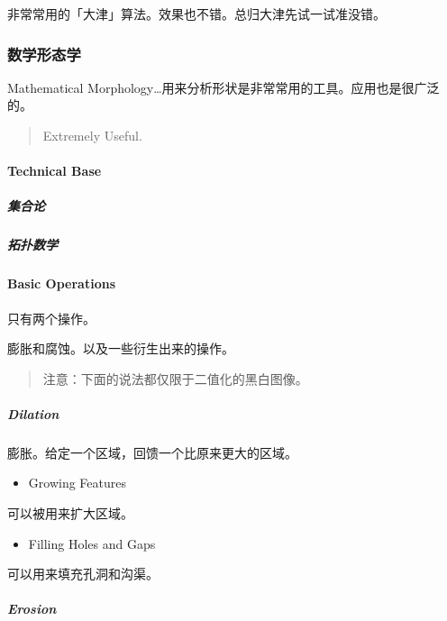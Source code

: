 \documentclass[
]{article}
\begin{document}
非常常用的「大津」算法。效果也不错。总归大津先试一试准没错。

\hypertarget{header-n88}{%
\subsubsection{数学形态学}\label{header-n88}}

Mathematical
Morphology\ldots 用来分析形状是非常常用的工具。应用也是很广泛的。

\begin{quote}
Extremely Useful.
\end{quote}

\hypertarget{header-n92}{%
\paragraph{Technical Base}\label{header-n92}}

\hypertarget{header-n93}{%
\subparagraph{集合论}\label{header-n93}}

\hypertarget{header-n94}{%
\subparagraph{拓扑数学}\label{header-n94}}

\hypertarget{header-n95}{%
\paragraph{Basic Operations}\label{header-n95}}

只有两个操作。

膨胀和腐蚀。以及一些衍生出来的操作。

\begin{quote}
注意：下面的说法都仅限于二值化的黑白图像。
\end{quote}

\hypertarget{header-n100}{%
\subparagraph{Dilation}\label{header-n100}}

膨胀。给定一个区域，回馈一个比原来更大的区域。

\begin{itemize}
\item
  Growing Features
\end{itemize}

可以被用来扩大区域。

\begin{itemize}
\item
  Filling Holes and Gaps
\end{itemize}

可以用来填充孔洞和沟渠。

\hypertarget{header-n110}{%
\subparagraph{Erosion}\label{header-n110}}
\end{document}

